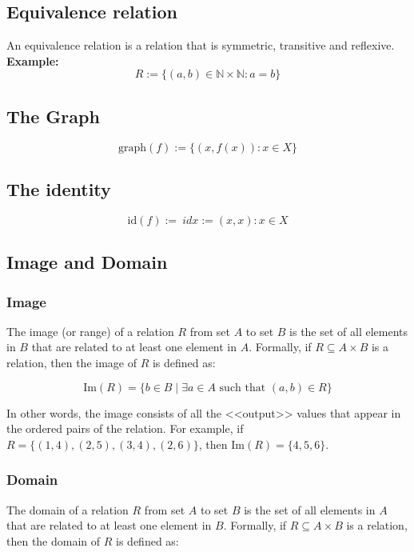 \subsection{Equivalence relation}
An equivalence relation is a relation that is symmetric, transitive and reflexive.
\newline
\textbf{Example:}
\[
	R:= \{ (a,b) \in \mathbb{N} \times \mathbb{N}: a = b\}
\]

\subsection{The Graph}

\[
	\text{graph}(f):= \{(x, f(x)): x \in X\}
\]

\subsection{The identity}

\[
	\text{id}(f):= \ idx:={(x, x): x \in X}
\]

\subsection{Image and Domain}

\subsubsection*{Image}
The image (or range) of a relation \(R\) from set \(A\) to set \(B\) is the set of all elements in \(B\) that are related to at least one element in \(A\). Formally, if \(R \subseteq A \times B\) is a relation, then the image of \(R\) is defined as:

\[\text{Im}(R) = \{b \in B \mid \exists a \in A \text{ such that } (a,b) \in R\}\]

In other words, the image consists of all the <<output>> values that appear in the ordered pairs of the relation. For example, if \(R = \{(1,4), (2,5), (3,4), (2,6)\}\), then \(\text{Im}(R) = \{4, 5, 6\}\).

\subsubsection*{Domain}
The domain of a relation \(R\) from set \(A\) to set \(B\) is the set of all elements in \(A\) that are related to at least one element in \(B\). Formally, if \(R \subseteq A \times B\) is a relation, then the domain of \(R\) is defined as:

